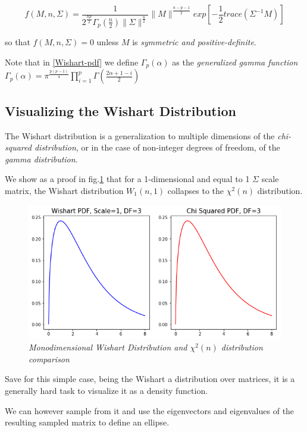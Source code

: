 \documentclass[12pt,openright,twoside,a4paper]{book}
\begin{document}
\begin{equation}
f(M, n, \Sigma)=\frac{1}{2^{\frac{np}{2}}\Gamma_p(\frac{n}{2})\|\Sigma\|^{\frac{n}{2}}}\|M\|^{\frac{n-p-1}{2}}exp[-\frac{1}{2}trace(\Sigma^{-1}M)]
\label{Wishart-pdf}
\end{equation} 

so that $f(M, n, \Sigma)=0$ unless $M$ is \textit{symmetric and positive-definite}. \cite{IMS}

Note that in \ref{Wishart-pdf} we define $\Gamma_p(\alpha)$ as the \textit{generalized gamma function} $\Gamma_p(\alpha)=\pi^\frac{p(p-1)}{4}\prod_{i=1}^p\Gamma(\frac{2\alpha+1-i}{2})$

\subsection{Visualizing the Wishart Distribution}

The Wishart distribution is a generalization to multiple dimensions of the \textit{chi-squared distribution}, or in the case of non-integer degrees of freedom, of the \textit{gamma distribution}.

We show as a proof in fig.\ref{Wish-chi2} that for a 1-dimensional and equal to 1 $\Sigma$ scale matrix, the Wishart distribution $W_1(n,1)$ collapses to the $\chi^2(n)$ distribution.

\begin{figure}[!h]
\centering
\includegraphics[scale=0.37]{wish-chi}
\caption{\textit{Monodimensional Wishart Distribution and $\chi^2(n)$ distribution comparison}}
\label{Wish-chi2}
\end{figure}

Save for this simple case, being the Wishart a distribution over matrices, it is a generally hard task to visualize it as a density function.

We can however sample from it and use the eigenvectors and eigenvalues of the resulting sampled matrix to define an ellipse.
\end{document}
